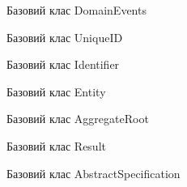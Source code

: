 
\vspace{\baselineskip}

Базовий клас DomainEvents


Базовий клас UniqueID


Базовий клас Identifier


Базовий клас Entity


Базовий клас AggregateRoot


Базовий клас Result


Базовий клас AbstractSpecification


\clearpage
